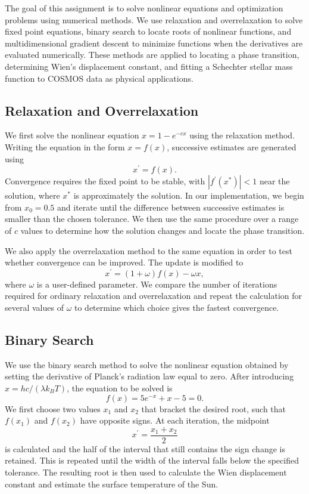 \documentclass[a4paper,11pt]{article}
\begin{document}
The goal of this assignment is to solve nonlinear equations and optimization problems using numerical methods. We use relaxation and overrelaxation to solve fixed point equations, binary search to locate roots of nonlinear functions, and multidimensional gradient descent to minimize functions when the derivatives are evaluated numerically. These methods are applied to locating a phase transition, determining Wien's displacement constant, and fitting a Schechter stellar mass function to COSMOS data as physical applications.

\subsection{Relaxation and Overrelaxation}

We first solve the nonlinear equation $x=1-e^{-cx}$ using the relaxation method. Writing the equation in the form $x=f(x)$, successive estimates are generated using $$x^\prime=f(x).$$ Convergence requires the fixed point to be stable, with $|f^\prime(x^*)|<1$ near the solution, where $x^*$ is approximately the solution. In our implementation, we begin from $x_0=0.5$ and iterate until the difference between successive estimates is smaller than the chosen tolerance. We then use the same procedure over a range of $c$ values to determine how the solution changes and locate the phase transition.

We also apply the overrelaxation method to the same equation in order to test whether convergence can be improved. The update is modified to $$x^\prime=(1+\omega)f(x)-\omega x,$$ where $\omega$ is a user-defined parameter. We compare the number of iterations required for ordinary relaxation and overrelaxation and repeat the calculation for several values of $\omega$ to determine which choice gives the fastest convergence.

\subsection{Binary Search}

We use the binary search method to solve the nonlinear equation obtained by setting the derivative of Planck's radiation law equal to zero. After introducing $x=hc/(\lambda k_BT)$, the equation to be solved is $$f(x)=5e^{-x}+x-5=0.$$ We first choose two values $x_1$ and $x_2$ that bracket the desired root, such that $f(x_1)$ and $f(x_2)$ have opposite signs. At each iteration, the midpoint $$x^\prime=\frac{x_1+x_2}{2}$$ is calculated and the half of the interval that still contains the sign change is retained. This is repeated until the width of the interval falls below the specified tolerance. The resulting root is then used to calculate the Wien displacement constant and estimate the surface temperature of the Sun.
\end{document}
